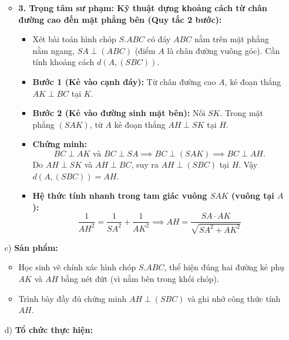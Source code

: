 \documentclass[12pt, a4paper]{article}
\begin{document}
\begin{itemize}[leftmargin=1.2cm]
\begin{itemize}[leftmargin=0.6cm]
        \item \textbf{3. Trọng tâm sư phạm: Kỹ thuật dựng khoảng cách từ chân đường cao đến mặt phẳng bên (Quy tắc 2 bước):}
        \begin{itemize}
            \item Xét bài toán hình chóp $S.ABC$ có đáy $ABC$ nằm trên mặt phẳng nằm ngang, $SA \perp (ABC)$ (điểm $A$ là chân đường vuông góc). Cần tính khoảng cách $d(A, (SBC))$.
            \item \textbf{Bước 1 (Kẻ vào cạnh đáy):} Từ chân đường cao $A$, kẻ đoạn thẳng $AK \perp BC$ tại $K$.
            \item \textbf{Bước 2 (Kẻ vào đường sinh mặt bên):} Nối $SK$. Trong mặt phẳng $(SAK)$, từ $A$ kẻ đoạn thẳng $AH \perp SK$ tại $H$.
            \item \textbf{Chứng minh:}
            $$BC \perp AK \text{ và } BC \perp SA \implies BC \perp (SAK) \implies BC \perp AH.$$
            Do $AH \perp SK$ và $AH \perp BC$, suy ra $AH \perp (SBC)$ tại $H$. Vậy $d(A, (SBC)) = AH$.
            \item \textbf{Hệ thức tính nhanh trong tam giác vuông $SAK$ (vuông tại $A$):}
            $$\dfrac{1}{AH^2} = \dfrac{1}{SA^2} + \dfrac{1}{AK^2} \implies AH = \dfrac{SA \cdot AK}{\sqrt{SA^2 + AK^2}}$$
        \end{itemize}
    \end{itemize}

    \item[c)] \textbf{Sản phẩm:}
    \begin{itemize}[leftmargin=0.6cm]
        \item Học sinh vẽ chính xác hình chóp $S.ABC$, thể hiện đúng hai đường kẻ phụ $AK$ và $AH$ bằng nét đứt (vì nằm bên trong khối chóp).
        \item Trình bày đầy đủ chứng minh $AH \perp (SBC)$ và ghi nhớ công thức tính $AH$.
    \end{itemize}

    \item[d)] \textbf{Tổ chức thực hiện:}
\end{itemize}
\end{document}
